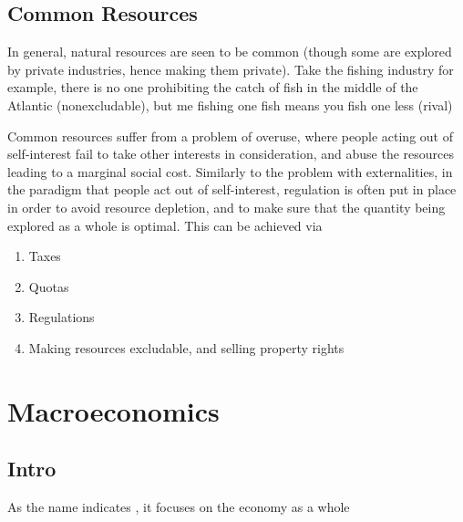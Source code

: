 \documentclass[english,course,draft]{Notes}
\begin{document}
\subsection{Common Resources}


\par{In general, natural resources are seen to be common (though some are explored by private industries, hence making them private). Take the fishing industry for example, there is no one prohibiting the catch of fish in the middle of the Atlantic (nonexcludable), but me fishing one fish means you fish one less (rival)}
\par{Common resources suffer from a problem of overuse, where people acting out of self-interest fail to take other interests in consideration, and abuse the resources leading to a marginal social cost. Similarly to the problem with externalities, in the paradigm that people act out of self-interest, regulation is often put in place in order to avoid resource depletion, and to make sure that the quantity being explored as a whole is optimal. This can be achieved via}

\begin{enumerate}
	\item Taxes
	\item Quotas
	\item Regulations
	\item Making resources excludable, and selling property rights
\end{enumerate}


\section{Macroeconomics}

\subsection{Intro}

\par{As the name indicates , it focuses on the economy as a whole}

\end{document}
